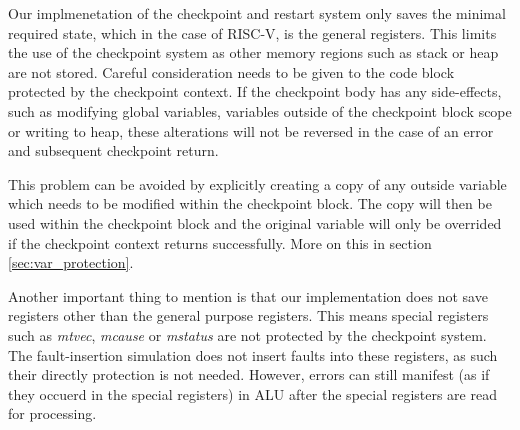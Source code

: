 Our implmenetation of the checkpoint and restart system only saves the minimal required state, which in the case of RISC-V, is the general registers. This limits the use of the checkpoint system as other memory regions such as stack or heap are not stored. Careful consideration needs to be given to the code block protected by the checkpoint context. If the checkpoint body has any side-effects, such as modifying global variables, variables outside of the checkpoint block scope or writing to heap, these alterations will not be reversed in the case of an error and subsequent checkpoint return.

This problem can be avoided by explicitly creating a copy of any outside variable which needs to be modified within the checkpoint block. The copy will then be used within the checkpoint block and the original variable will only be overrided if the checkpoint context returns successfully. More on this in section \ref{sec:var_protection}.

Another important thing to mention is that our implementation does not save registers other than the general purpose registers. This means special registers such as \textit{mtvec}, \textit{mcause} or \textit{mstatus} are not protected by the checkpoint system. The fault-insertion simulation does not insert faults into these registers, as such their directly protection is not needed. However, errors can still manifest (as if they occuerd in the special registers) in ALU after the special registers are read for processing.
